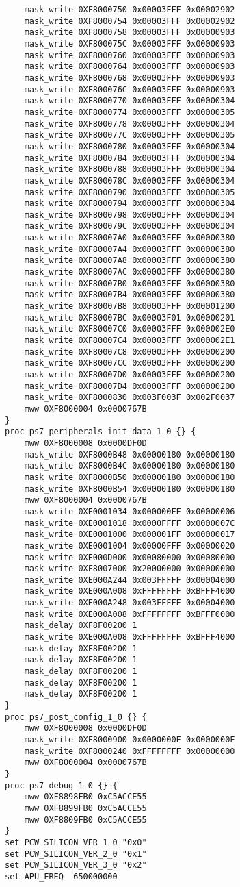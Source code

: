 \begin{lstlisting}
    mask_write 0XF8000750 0x00003FFF 0x00002902
    mask_write 0XF8000754 0x00003FFF 0x00002902
    mask_write 0XF8000758 0x00003FFF 0x00000903
    mask_write 0XF800075C 0x00003FFF 0x00000903
    mask_write 0XF8000760 0x00003FFF 0x00000903
    mask_write 0XF8000764 0x00003FFF 0x00000903
    mask_write 0XF8000768 0x00003FFF 0x00000903
    mask_write 0XF800076C 0x00003FFF 0x00000903
    mask_write 0XF8000770 0x00003FFF 0x00000304
    mask_write 0XF8000774 0x00003FFF 0x00000305
    mask_write 0XF8000778 0x00003FFF 0x00000304
    mask_write 0XF800077C 0x00003FFF 0x00000305
    mask_write 0XF8000780 0x00003FFF 0x00000304
    mask_write 0XF8000784 0x00003FFF 0x00000304
    mask_write 0XF8000788 0x00003FFF 0x00000304
    mask_write 0XF800078C 0x00003FFF 0x00000304
    mask_write 0XF8000790 0x00003FFF 0x00000305
    mask_write 0XF8000794 0x00003FFF 0x00000304
    mask_write 0XF8000798 0x00003FFF 0x00000304
    mask_write 0XF800079C 0x00003FFF 0x00000304
    mask_write 0XF80007A0 0x00003FFF 0x00000380
    mask_write 0XF80007A4 0x00003FFF 0x00000380
    mask_write 0XF80007A8 0x00003FFF 0x00000380
    mask_write 0XF80007AC 0x00003FFF 0x00000380
    mask_write 0XF80007B0 0x00003FFF 0x00000380
    mask_write 0XF80007B4 0x00003FFF 0x00000380
    mask_write 0XF80007B8 0x00003FFF 0x00001200
    mask_write 0XF80007BC 0x00003F01 0x00000201
    mask_write 0XF80007C0 0x00003FFF 0x000002E0
    mask_write 0XF80007C4 0x00003FFF 0x000002E1
    mask_write 0XF80007C8 0x00003FFF 0x00000200
    mask_write 0XF80007CC 0x00003FFF 0x00000200
    mask_write 0XF80007D0 0x00003FFF 0x00000200
    mask_write 0XF80007D4 0x00003FFF 0x00000200
    mask_write 0XF8000830 0x003F003F 0x002F0037
    mww 0XF8000004 0x0000767B
}
proc ps7_peripherals_init_data_1_0 {} {
    mww 0XF8000008 0x0000DF0D
    mask_write 0XF8000B48 0x00000180 0x00000180
    mask_write 0XF8000B4C 0x00000180 0x00000180
    mask_write 0XF8000B50 0x00000180 0x00000180
    mask_write 0XF8000B54 0x00000180 0x00000180
    mww 0XF8000004 0x0000767B
    mask_write 0XE0001034 0x000000FF 0x00000006
    mask_write 0XE0001018 0x0000FFFF 0x0000007C
    mask_write 0XE0001000 0x000001FF 0x00000017
    mask_write 0XE0001004 0x00000FFF 0x00000020
    mask_write 0XE000D000 0x00080000 0x00080000
    mask_write 0XF8007000 0x20000000 0x00000000
    mask_write 0XE000A244 0x003FFFFF 0x00004000
    mask_write 0XE000A008 0xFFFFFFFF 0xBFFF4000
    mask_write 0XE000A248 0x003FFFFF 0x00004000
    mask_write 0XE000A008 0xFFFFFFFF 0xBFFF0000
    mask_delay 0XF8F00200 1
    mask_write 0XE000A008 0xFFFFFFFF 0xBFFF4000
    mask_delay 0XF8F00200 1
    mask_delay 0XF8F00200 1
    mask_delay 0XF8F00200 1
    mask_delay 0XF8F00200 1
    mask_delay 0XF8F00200 1
}
proc ps7_post_config_1_0 {} {
    mww 0XF8000008 0x0000DF0D
    mask_write 0XF8000900 0x0000000F 0x0000000F
    mask_write 0XF8000240 0xFFFFFFFF 0x00000000
    mww 0XF8000004 0x0000767B
}
proc ps7_debug_1_0 {} {
    mww 0XF8898FB0 0xC5ACCE55
    mww 0XF8899FB0 0xC5ACCE55
    mww 0XF8809FB0 0xC5ACCE55
}
set PCW_SILICON_VER_1_0 "0x0"
set PCW_SILICON_VER_2_0 "0x1"
set PCW_SILICON_VER_3_0 "0x2"
set APU_FREQ  650000000



\end{lstlisting}
